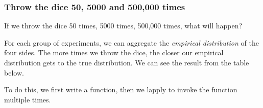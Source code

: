 \documentclass[
]{book}
\begin{document}
\hypertarget{throw-the-dice-50-5000-and-500000-times}{%
\subsubsection{Throw the dice 50, 5000 and 500,000 times}\label{throw-the-dice-50-5000-and-500000-times}}

If we throw the dice 50 times, 5000 times, 500,000 times, what will happen?

For each group of experiments, we can aggregate the \emph{empirical distribution} of the four sides. The more times we throw the dice, the closer our empirical distribution gets to the true distribution. We can see the result from the table below.

To do this, we first write a function, then we lapply to invoke the function multiple times.
\end{document}

